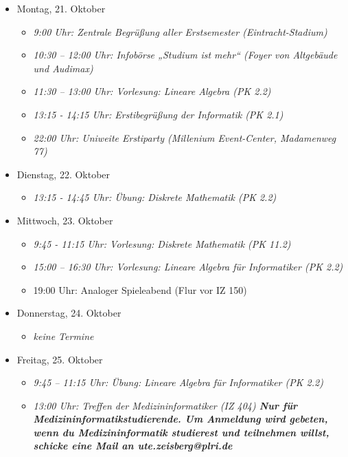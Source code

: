 \begin{itemize}
    \item Montag, 21. Oktober
        \begin{itemize}
            \item \textit{9:00 Uhr: Zentrale Begrüßung aller Erstsemester (Eintracht-Stadium)}
            \item \textit{10:30 – 12:00 Uhr: Infobörse „Studium ist mehr“ (Foyer von Altgebäude und Audimax)}
            \item \textit{11:30 – 13:00 Uhr: Vorlesung: Lineare Algebra (PK 2.2)}
            \item \textit{13:15 - 14:15 Uhr: Erstibegrüßung der Informatik (PK 2.1)}
            \item \textit{22:00 Uhr: Uniweite Erstiparty (Millenium Event-Center, Madamenweg 77)}
        \end{itemize}
    \item Dienstag, 22. Oktober
        \begin{itemize}
            \item \textit{13:15 - 14:45 Uhr: Übung: Diskrete Mathematik (PK 2.2)}
        \end{itemize}
    \item Mittwoch, 23. Oktober
        \begin{itemize}
            \item \textit{9:45 - 11:15 Uhr: Vorlesung: Diskrete Mathematik (PK 11.2)}
            \item \textit{15:00 – 16:30 Uhr: Vorlesung: Lineare Algebra für Informatiker (PK 2.2)}
            \item 19:00 Uhr: Analoger Spieleabend (Flur vor IZ 150)
        \end{itemize}
    \item Donnerstag, 24. Oktober
        \begin{itemize}
            \item \textit{keine Termine}
        \end{itemize}
    \item Freitag, 25. Oktober
        \begin{itemize}
            \item \textit{9:45 – 11:15 Uhr: Übung: Lineare Algebra für Informatiker (PK 2.2)}
            \item \textit{13:00 Uhr: Treffen der Medizininformatiker (IZ 404) \textbf{Nur für Medizininformatikstudierende. Um Anmeldung wird gebeten, wenn du Medizininformatik studierest und teilnehmen willst, schicke eine Mail an ute.zeisberg@plri.de}}

\end{itemize}
\end{itemize}
